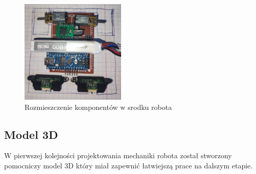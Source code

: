 \documentclass[polish,polish,a4paper]{article}
\begin{document}
    \begin{figure}[ht!]
        \centering
        \includegraphics[width=50mm]{photo/srodek.jpg}
        \caption{Rozmieszczenie komponentów w srodku robota\label{overflow}}
        \end{figure}
    
    \subsection{Model 3D}
    W pierwszej kolejności projektowania mechaniki robota został stworzony pomocniczy model 3D który miał zapewnić łatwiejszą prace na dalszym etapie. 
    
\end{document}
